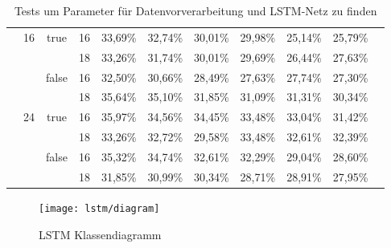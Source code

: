\begin{sidewaystable}[h]
\begin{tabular}{|c|c|c|c|c|c|c|c|c|c|c|}
  &\multirow{4}{*}{16}&\multirow{2}{*}{true}&16&33,69\%&32,74\%&30,01\%&29,98\%&25,14\%&25,79\%&\\\cline{4-10}
  & & &18&33,26\%&31,74\%&30,01\%&29,69\%&26,44\%&27,63\%&\\\cline{3-10}
  & &\multirow{2}{*}{false}&16&32,50\%&30,66\%&28,49\%&27,63\%&27,74\%&27,30\%&\\\cline{4-10}
  & & &18&35,64\%&35,10\%&31,85\%&31,09\%&31,31\%&30,34\%&\\\cline{2-10}
  
  &\multirow{4}{*}{24}&\multirow{2}{*}{true}&16&35,97\%&34,56\%&34,45\%&33,48\%&33,04\%&31,42\%&\\\cline{4-10}
  & & &18&33,26\%&32,72\%&29,58\%&33,48\%&32,61\%&32,39\%&\\\cline{3-10}
  & &\multirow{2}{*}{false}&16&35,32\%&34,74\%&32,61\%&32,29\%&29,04\%&28,60\%&\\\cline{4-10}
  & & &18&31,85\%&30,99\%&30,34\%&28,71\%&28,91\%&27,95\%&\\
\hline
\end{tabular} 
\caption[Tests für Daten und LSTM-Netz]{Tests um Parameter für Datenvorverarbeitung und LSTM-Netz zu finden}
\label{tab:inputtests}
\end{sidewaystable}

\begin{figure*}[htfp]
  \begin{center}
  \texttt{[image: lstm/diagram]}
  \caption[\acs{LSTM} Klassendiagramm]{\acs{LSTM} Klassendiagramm}
  \label{fig:lstm_class}
  \end{center}
\end{figure*}  
